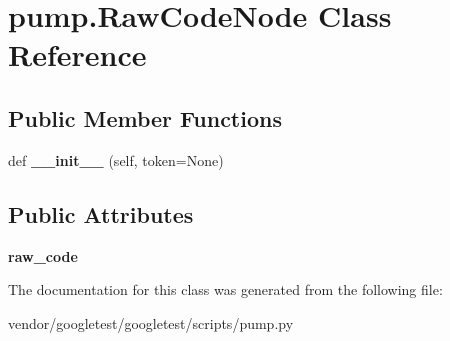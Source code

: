 \hypertarget{classpump_1_1RawCodeNode}{}\section{pump.\+Raw\+Code\+Node Class Reference}
\label{classpump_1_1RawCodeNode}
\subsection*{Public Member Functions}
\begin{DoxyCompactItemize}
\item 
def {\bfseries \+\_\+\+\_\+init\+\_\+\+\_\+} (self, token=None)\hypertarget{classpump_1_1RawCodeNode_a7ba81f4da42d4e96a89713032867f87f}{}\label{classpump_1_1RawCodeNode_a7ba81f4da42d4e96a89713032867f87f}

\end{DoxyCompactItemize}
\subsection*{Public Attributes}
\begin{DoxyCompactItemize}
\item 
{\bfseries raw\+\_\+code}\hypertarget{classpump_1_1RawCodeNode_ab36224d959e0d8f803e9fac8e6a0baab}{}\label{classpump_1_1RawCodeNode_ab36224d959e0d8f803e9fac8e6a0baab}

\end{DoxyCompactItemize}


The documentation for this class was generated from the following file\+:\begin{DoxyCompactItemize}
\item 
vendor/googletest/googletest/scripts/pump.\+py\end{DoxyCompactItemize}

